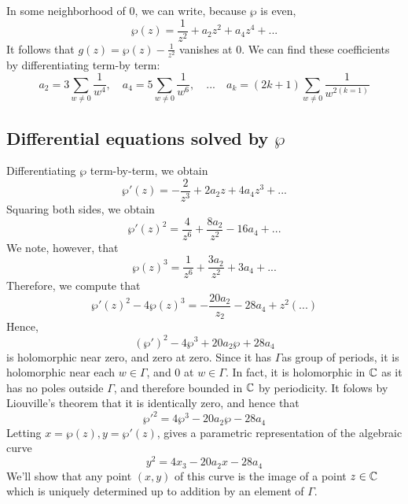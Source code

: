 \documentclass{article}
\begin{document}
In some neighborhood of 0, we can write, because \(\wp\) is even,
\begin{equation}\wp(z) = \frac{1}{z^2} + a_2z^2 + a_4z^4 + ...\end{equation}
It follows that \(g(z) = \wp(z) - \frac{1}{z^2}\) vanishes at 0. We can find these coefficients by differentiating term-by term:
\begin{equation}a_2 = 3\sum_{w \neq 0}\frac{1}{w^4}, \quad a_4 = 5\sum_{w \neq 0}\frac{1}{w^6}, \quad ... \quad a_k = (2k + 1)\sum_{w \neq 0}\frac{1}{w^{2(k = 1)}}\end{equation}

\subsection{Differential equations solved by \(\wp\)}

Differentiating \(\wp\) term-by-term, we obtain
\begin{equation}\wp'(z) = -\frac{2}{z^3} + 2a_2z + 4a_4z^3 + ...\end{equation}
Squaring both sides, we obtain
\begin{equation}\wp'(z)^2 = \frac{4}{z^6} + \frac{8a_2}{z^2} - 16a_4 + ...\end{equation}
We note, however, that
\begin{equation}\wp(z)^3 = \frac{1}{z^6} + \frac{3a_2}{z^2} + 3a_4 + ...\end{equation}
Therefore, we compute that
\begin{equation}\wp'(z)^2 - 4\wp(z)^3 = -\frac{20a_2}{z_2} - 28a_4 + z^2(...)\end{equation}
Hence,
\begin{equation}(\wp')^2 - 4\wp^3 + 20a_2\wp + 28a_4\end{equation}
is holomorphic near zero, and zero at zero. Since it has \(\Gamma\)as group of periods, it is holomorphic near each \(w \in \Gamma\), and \(0\) at \(w \in \Gamma\). In fact, it is holomorphic in \(\mathbb{C}\) as it has no poles outside \(\Gamma\), and therefore bounded in \(\mathbb{C}\) by periodicity. It folows by Liouville's theorem that it is identically zero, and hence that
\begin{equation}\wp'^2 = 4\wp^3 - 20a_2\wp - 28a_4\end{equation}
Letting \(x = \wp(z), y = \wp'(z)\), gives a parametric representation of the algebraic curve
\begin{equation}y^2 = 4x_3 - 20a_2x - 28a_4\end{equation}
We'll show that any point \((x, y)\) of this curve is the image of a point \(z \in \mathbb{C}\) which is uniquely determined up to addition by an element of \(\Gamma\).
\end{document}
